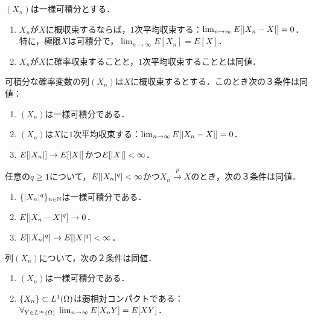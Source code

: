 \documentclass[uplatex,dvipdfmx]{jsreport}
\begin{document}
\begin{theorem}[一般化されたLebesgueの優収束定理]
    $(X_n)$は一様可積分とする．
    \begin{enumerate}
        \item $X_n$が$X$に概収束するならば，$1$次平均収束する：$\lim_{n\to\infty}E[\lvert X_n-X\rvert]=0$．
        特に，極限$X$は可積分で，$\lim_{n\to\infty}E[X_n]=E[X]$．
        \item $X_n$が$X$に確率収束することと，$1$次平均収束することとは同値．
    \end{enumerate}
\end{theorem}

\begin{corollary}[一様可積分性の特徴付け]
    可積分な確率変数の列$(X_n)$は$X$に概収束するとする．このとき次の３条件は同値：
    \begin{enumerate}
        \item $(X_n)$は一様可積分である．
        \item $(X_n)$は$X$に$1$次平均収束する：$\lim_{n\to\infty}E[\lvert X_n-X\rvert]=0$．
        \item $E[\lvert X_n\rvert]\to E[\lvert X\rvert]$かつ$E[\lvert X\rvert]<\infty$．
    \end{enumerate}
\end{corollary}

\begin{corollary}[さらに一般化]
    任意の$q\ge1$について，$E[\lvert X_n\rvert^q]<\infty$かつ$X_n\xrightarrow{p}X$のとき，次の３条件は同値．
    \begin{enumerate}
        \item $\{\lvert X_n\rvert^q\}_{n\in\mathbb{N}}$は一様可積分である．
        \item $E[\lvert X_n-X\rvert^q]\to0$．
        \item $E[\lvert X_n\rvert^q]\to E[\lvert X\rvert^q]<\infty$．
    \end{enumerate}
\end{corollary}

\begin{theorem}
    列$(X_n)$について，次の２条件は同値．
    \begin{enumerate}
        \item $(X_n)$は一様可積分である．
        \item $\{X_n\}\subset L^1(\Omega)$は弱相対コンパクトである：$\forall_{Y\in L^\infty(\Omega)}\;\lim_{n\to\infty}E[X_nY]=E[XY]$．
    \end{enumerate}
\end{theorem}
\end{document}
